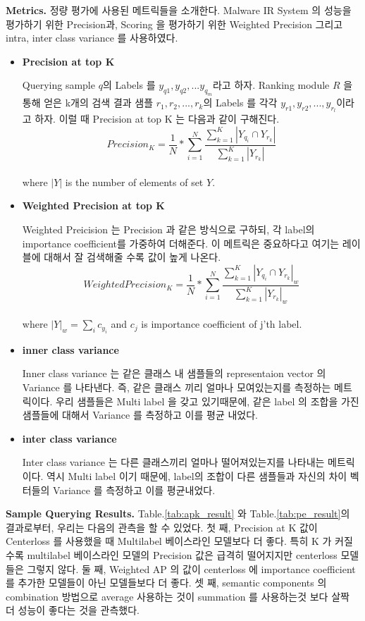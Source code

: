 \textbf{Metrics. } 정량 평가에 사용된 메트릭들을 소개한다. Malware IR System 의 성능을 평가하기 위한 Precision과, Scoring 을 평가하기 위한 Weighted Precision 그리고 intra, inter class variance 를 사용하였다. 
\begin{itemize}
	\item{ \textbf{Precision at top K} 


	Querying sample $q$의 Labels 를 $y_{q1}, y_{q2}, ... y_{q_m}$라고 하자. Ranking module $R$ 을 통해 얻은 k개의 검색 결과 샘플 $r_1, r_2, ..., r_k$의 Labels 를 각각 $y_{r1}, y_{r2}, ..., y_{r_l}$이라고 하자. 이럴 때 Precision at top K 는 다음과 같이 구해진다. 
	\[
	Precision_{K} = \frac{1}{N} *\sum_{i=1}^{N}{ \frac{ \sum_{k=1}^{K}{|Y_{q_i} \cap Y_{r_k}|}}{  \sum_{k=1}^{K}{ |Y_{r_k}| }  }}
	\]\\
	where $|Y|$ is the number of elements of set $Y$.
	}
	\item{ \textbf{Weighted Precision at top K } 
	
	Weighted Preicision 는 Precision 과 같은 방식으로 구하되, 각 label의 importance coefficient를 가중하여 더해준다. 이 메트릭은 중요하다고 여기는 레이블에 대해서 잘 검색해줄 수록 값이 높게 나온다. 
	\[
	WeightedPrecision_{K} = \frac{1}{N} *\sum_{i=1}^{N}{ \frac{ \sum_{k=1}^{K}{|Y_{q_i} \cap Y_{r_k}|_w}}{  \sum_{k=1}^{K}{ |Y_{r_k}|_w }  }}
	\]\\
	where $|Y|_w = \sum_i{c_{y_i}}$ and $c_j$ is importance coefficient of j'th label.
	}
	\item{ \textbf{inner class variance} 
	
	Inner class variance 는 같은 클래스 내 샘플들의 representaion vector 의 Variance 를 나타낸다. 즉, 같은 클래스 끼리 얼마나 모여있는지를 측정하는 메트릭이다. 우리 샘플들은 Multi label 을 갖고 있기때문에, 같은 label 의 조합을 가진 샘플들에 대해서 Variance 를 측정하고 이를 평균 내었다.   
	}
	\item{ \textbf{inter class variance} 
	
	Inter class variance 는 다른 클래스끼리 얼마나 떨어져있는지를 나타내는 메트릭이다. 역시 Multi label 이기 때문에, label의 조합이 다른 샘플들과 자신의 차이 벡터들의 Variance 를 측정하고 이를 평균내었다. 
	}
\end{itemize}



\textbf{Sample Querying Results. }
Table.\ref{tab:apk_result} 와 Table.\ref{tab:pe_result}의 결과로부터, 우리는 다음의 관측을 할 수 있었다. 
첫 째, Precision at K 값이 Centerloss 를 사용했을 때 Multilabel 베이스라인 모델보다 더 좋다. 특히 K 가 커질수록 multilabel 베이스라인 모델의 Precision 값은 급격히 떨어지지만 centerloss 모델들은 그렇지 않다. 
둘 째, Weighted AP 의 값이 centerloss 에 importance coefficient 를 추가한 모델들이 아닌 모델들보다 더 좋다. 
셋 째, semantic components 의 combination 방법으로 average 사용하는 것이 summation 를 사용하는것 보다 살짝 더 성능이 좋다는 것을 관측했다.

